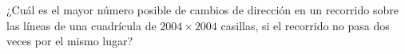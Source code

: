 ¿Cuál es el mayor número posible de cambios de dirección en un recorrido sobre las líneas de una cuadrícula de $2004\times 2004$ casillas, si el recorrido no pasa dos veces por el mismo lugar?